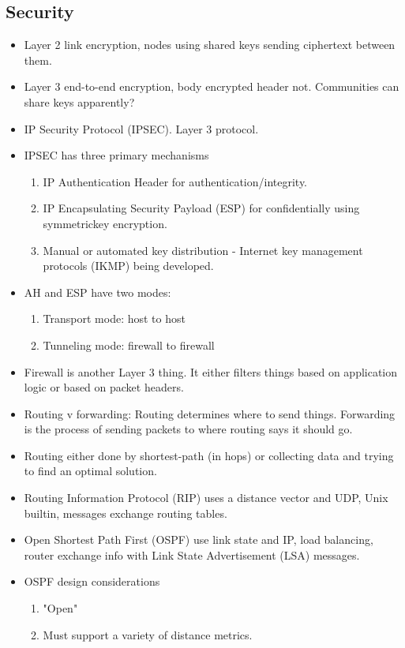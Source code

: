 \documentclass{scrartcl}
\begin{document}
\subsection*{Security}
\begin{itemize}
\item Layer 2 link encryption, nodes using shared keys sending ciphertext
between them.
\item Layer 3 end-to-end encryption, body encrypted header not. Communities can
share keys apparently?
\item IP Security Protocol (IPSEC). Layer 3 protocol.
\item IPSEC has three primary mechanisms
\begin{enumerate}
\item IP Authentication Header for authentication/integrity.
\item IP Encapsulating Security Payload (ESP) for confidentially using
symmetrickey encryption.
\item Manual or automated key distribution - Internet key management protocols
(IKMP) being developed.
\end{enumerate}
\item AH and ESP have two modes:
\begin{enumerate}
\item Transport mode: host to host
\item Tunneling mode: firewall to firewall
\end{enumerate}
\item Firewall is another Layer 3 thing. It either filters things based on
application logic or based on packet headers.
\item Routing v forwarding: Routing determines where to send things. Forwarding
is the process of sending packets to where routing says it should go.
\item Routing either done by shortest-path (in hops) or collecting data and
trying to find an optimal solution.
\item Routing Information Protocol (RIP) uses a distance vector and UDP,
Unix builtin, messages exchange routing tables.
\item Open Shortest Path First (OSPF) use link state and IP, load balancing,
router exchange info with Link State Advertisement (LSA) messages.
\item OSPF design considerations
\begin{enumerate}
\item "Open"
\item Must support a variety of distance metrics.

\end{enumerate}
\end{itemize}
\end{document}
